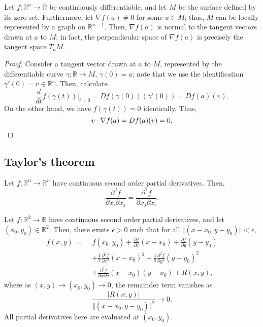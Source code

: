 \documentclass[11pt]{article}
\newcommand{\R}{\mathbb{R}}
\newcommand{\norm}[1]{\Vert #1 \Vert}
\newcommand{\dd}[2]{\frac{d #1}{d #2}}
\newcommand{\pp}[2]{\frac{\partial #1}{\partial #2}}
\newcommand{\ppn}[3][]{\frac{\partial^{#1} #2}{\partial #3^{#1}}}
\newcommand{\grad}{\nabla}
\theoremstyle{definition}
\theoremstyle{remark}
\numberwithin{equation}{section}
\begin{document}
    \begin{theorem}
        Let $f\colon \R^n \to \R$ be continuously differentiable, and let $M$ be the
        surface defined by its zero set. Furthermore, let $\grad{f}(a) \neq 0$ for
        some $a \in M$; thus, $M$ can be locally represented by a graph on $\R^{n -
        1}$. Then, $\grad{f}(a)$ is normal to the tangent vectors drawn at $a$ to
        $M$; in fact, the perpendicular space of $\grad{f}(a)$ is precisely the
        tangent space $T_aM$.
    \end{theorem}
    \begin{proof}
        Consider a tangent vector drawn at $a$ to $M$, represented by the
        differentiable curve $\gamma\colon \R \to M$, $\gamma(0) = a$; note that
        we use the identification $\gamma'(0) = v \in \R^n$. Then, calculate \[
            \dd{}{t}f(\gamma(t))\Big|_{t = 0} = Df(\gamma(0))(\gamma'(0)) = Df(a)(v).
        \] On the other hand, we have $f(\gamma(t)) = 0$ identically. Thus, \[
            v\cdot \grad{f}(a) = Df(a)(v) = 0. \qedhere
        \]
    \end{proof}

    \subsection{Taylor's theorem}
    
    \begin{theorem}
        Let $f\colon \R^n \to \R^n$ have continuous second order partial derivatives.
        Then, \[
            \frac{\partial^2 f}{\partial x_i\partial x_j} = \frac{\partial^2
            f}{\partial x_j\partial x_i}.
        \] 
    \end{theorem}

    \begin{theorem}
        Let $f\colon \R^2 \to \R$ have continuous second order partial derivatives,
        and let $(x_0, y_0) \in \R^2$. Then, there exists $\epsilon > 0$ such that
        for all $\norm{(x - x_0, y - y_0)} < \epsilon$, 
        \begin{align*}
            f(x, y) \;=\; &f(x_0, y_0) + \pp{f}{x}(x - x_0) + \pp{f}{y}(y - y_0) \\
            & + \frac{1}{2}\ppn[2]{f}{x}(x - x_0)^2 + \frac{1}{2}\ppn[2]{f}{y}(y -
            y_0)^2 \\
            & + \frac{\partial^2 f}{\partial x\partial y}(x - x_0)(y - x_0) + R(x,
            y),
        \end{align*}
        where as $(x, y) \to (x_0, y_0) \to 0$, the remainder term vanishes as \[
            \frac{|R(x, y)|}{\norm{(x - x_0, y - y_0)}^2} \to 0.
        \] All partial derivatives here are evaluated at $(x_0, y_0)$.
    \end{theorem}
\end{document}
